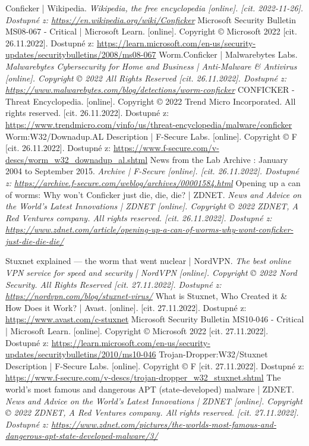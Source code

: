 \documentclass[a4paper,12pt]{article}
\begin{document}
{	
	{
		Conficker | Wikipedia.
		\it{Wikipedia, the free encyclopedia} [online]. [cit. 2022-11-26].
		Dostupné z: \url{https://en.wikipedia.org/wiki/Conficker}
	}	
	{
		Microsoft Security Bulletin MS08-067 - Critical | Microsoft Learn.
		[online]. Copyright © Microsoft 2022 [cit. 26.11.2022].
		Dostupné z: \url{https://learn.microsoft.com/en-us/security-updates/securitybulletins/2008/ms08-067}
	}
	{
		Worm.Conficker | Malwarebytes Labs.
		\it{Malwarebytes Cybersecurity for Home and Business | Anti-Malware \& Antivirus}
		[online]. Copyright © 2022 All Rights Reserved [cit. 26.11.2022].
		Dostupné z: \url{https://www.malwarebytes.com/blog/detections/worm-conficker}
	}
	{
		CONFICKER - Threat Encyclopedia.
		[online]. Copyright © 2022 Trend Micro Incorporated. All rights reserved. [cit. 26.11.2022].
		Dostupné z: \url{https://www.trendmicro.com/vinfo/us/threat-encyclopedia/malware/conficker}
	}
	{
		Worm:W32/Downadup.AL Description | F-Secure Labs.
		[online]. Copyright © F [cit. 26.11.2022].
		Dostupné z: \url{https://www.f-secure.com/v-descs/worm_w32_downadup_al.shtml}
	}
	{
		News from the Lab Archive : January 2004 to September 2015.
		\it{Archive | F-Secure} [online]. [cit. 26.11.2022].
		Dostupné z: \url{https://archive.f-secure.com/weblog/archives/00001584.html}
	}
	{
		Opening up a can of worms: Why won't Conficker just die, die, die? | ZDNET.
		\it{News and Advice on the World's Latest Innovations | ZDNET}
		[online]. Copyright © 2022 ZDNET, A Red Ventures company. All rights reserved. [cit. 26.11.2022].
		Dostupné z: \url{https://www.zdnet.com/article/opening-up-a-can-of-worms-why-wont-conficker-just-die-die-die/}
	}
	
	{
		Stuxnet explained — the worm that went nuclear | NordVPN. 
		\it{The best online VPN service for speed and security | NordVPN}
		[online]. Copyright © 2022 Nord Security. All Rights Reserved [cit. 27.11.2022]. 
		Dostupné z: \url{https://nordvpn.com/blog/stuxnet-virus/}
	}
	{
		What is Stuxnet, Who Created it \& How Does it Work? | Avast.
		[online]. [cit. 27.11.2022].
		Dostupné z: \url{https://www.avast.com/c-stuxnet}
	}
	{
		Microsoft Security Bulletin MS10-046 - Critical | Microsoft Learn. 
		[online]. Copyright © Microsoft 2022 [cit. 27.11.2022].
		Dostupné z: \url{https://learn.microsoft.com/en-us/security-updates/securitybulletins/2010/ms10-046}
	}
	{
		Trojan-Dropper:W32/Stuxnet Description | F-Secure Labs.
		[online]. Copyright © F [cit. 27.11.2022].
		Dostupné z: \url{https://www.f-secure.com/v-descs/trojan-dropper_w32_stuxnet.shtml}
	}
	{
		The world's most famous and dangerous APT (state-developed) malware | ZDNET.
		\it{News and Advice on the World's Latest Innovations | ZDNET}
		[online]. Copyright © 2022 ZDNET, A Red Ventures company. All rights reserved. [cit. 27.11.2022].
		Dostupné z: \url{https://www.zdnet.com/pictures/the-worlds-most-famous-and-dangerous-apt-state-developed-malware/3/}
	}
}
\end{document}
